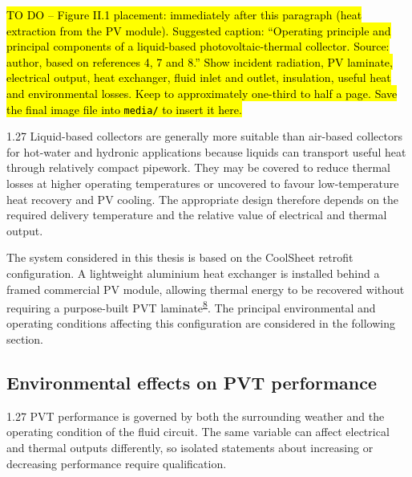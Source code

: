 \documentclass[12pt,letterpaper]{article}
\newcommand{\done}{\ \textcolor{green!45!black}{$\checkmark$}} %
\newcommand{\placeholder}[1]{\hl{#1}}
\DeclareRobustCommand{\citenum}[1]{\hyperlink{ref:#1}{#1}} %
\begin{document}
\placeholder{TO DO -- Figure II.1 placement: immediately after this paragraph (heat extraction from the PV module). Suggested caption: ``Operating principle and principal components of a liquid-based photovoltaic-thermal collector. Source: author, based on references 4, 7 and 8.'' Show incident radiation, PV laminate, electrical output, heat exchanger, fluid inlet and outlet, insulation, useful heat and environmental losses. Keep to approximately one-third to half a page. Save the final image file into \texttt{media/} to insert it here.}

\begin{spacing}{1.27}
Liquid-based collectors are generally more suitable than air-based collectors for hot-water and hydronic applications because liquids can transport useful heat through relatively compact pipework. They may be covered to reduce thermal losses at higher operating temperatures or uncovered to favour low-temperature heat recovery and PV cooling. The appropriate design therefore depends on the required delivery temperature and the relative value of electrical and thermal output.\par

\vspace{0.15in}

The system considered in this thesis is based on the CoolSheet retrofit configuration. A lightweight aluminium heat exchanger is installed behind a framed commercial PV module, allowing thermal energy to be recovered without requiring a purpose-built PVT laminate\textsuperscript{\citenum{8}}. The principal environmental and operating conditions affecting this configuration are considered in the following section.\par
\end{spacing}

\subsection[Environmental effects on PVT performance\done]{Environmental effects on PVT performance}\label{sec9}

\begin{spacing}{1.27}
PVT performance is governed by both the surrounding weather and the operating condition of the fluid circuit. The same variable can affect electrical and thermal outputs differently, so isolated statements about increasing or decreasing performance require qualification.\par
\end{spacing}
\end{document}
